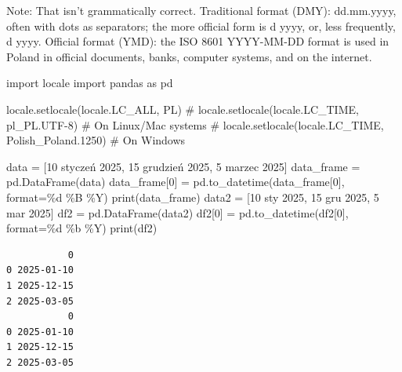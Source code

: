\documentclass[
  english,
  letterpaper,
  DIV=11,
  numbers=noendperiod]{scrreprt}
\newenvironment{Shaded}{\begin{snugshade}}{\end{snugshade}}
\newcommand{\BuiltInTok}[1]{\textcolor[rgb]{0.00,0.23,0.31}{#1}}
\newcommand{\CommentTok}[1]{\textcolor[rgb]{0.37,0.37,0.37}{#1}}
\newcommand{\DecValTok}[1]{\textcolor[rgb]{0.68,0.00,0.00}{#1}}
\newcommand{\ImportTok}[1]{\textcolor[rgb]{0.00,0.46,0.62}{#1}}
\newcommand{\NormalTok}[1]{\textcolor[rgb]{0.00,0.23,0.31}{#1}}
\newcommand{\OperatorTok}[1]{\textcolor[rgb]{0.37,0.37,0.37}{#1}}
\newcommand{\SpecialCharTok}[1]{\textcolor[rgb]{0.37,0.37,0.37}{#1}}
\newcommand{\StringTok}[1]{\textcolor[rgb]{0.13,0.47,0.30}{#1}}
\begin{document}
Note: That isn't grammatically correct. Traditional format (DMY):
dd.mm.yyyy, often with dots as separators; the more official form is d
yyyy, or, less frequently, d yyyy. Official format (YMD): the ISO 8601
YYYY-MM-DD format is used in Poland in official documents, banks,
computer systems, and on the internet.

\begin{Shaded}
\begin{Highlighting}[]
\ImportTok{import}\NormalTok{ locale}
\ImportTok{import}\NormalTok{ pandas }\ImportTok{as}\NormalTok{ pd}

\NormalTok{locale.setlocale(locale.LC\_ALL, }\StringTok{\textquotesingle{}PL\textquotesingle{}}\NormalTok{)}
\CommentTok{\# locale.setlocale(locale.LC\_TIME, \textquotesingle{}pl\_PL.UTF{-}8\textquotesingle{})  \# On Linux/Mac systems}
\CommentTok{\# locale.setlocale(locale.LC\_TIME, \textquotesingle{}Polish\_Poland.1250\textquotesingle{})  \# On Windows}

\NormalTok{data }\OperatorTok{=}\NormalTok{ [}\StringTok{\textquotesingle{}10 styczeń 2025\textquotesingle{}}\NormalTok{, }\StringTok{\textquotesingle{}15 grudzień 2025\textquotesingle{}}\NormalTok{, }\StringTok{\textquotesingle{}5 marzec 2025\textquotesingle{}}\NormalTok{]}
\NormalTok{data\_frame }\OperatorTok{=}\NormalTok{ pd.DataFrame(data)}
\NormalTok{data\_frame[}\DecValTok{0}\NormalTok{] }\OperatorTok{=}\NormalTok{ pd.to\_datetime(data\_frame[}\DecValTok{0}\NormalTok{], }\BuiltInTok{format}\OperatorTok{=}\StringTok{\textquotesingle{}}\SpecialCharTok{\%d}\StringTok{ \%B \%Y\textquotesingle{}}\NormalTok{)}
\BuiltInTok{print}\NormalTok{(data\_frame)}
\NormalTok{data2 }\OperatorTok{=}\NormalTok{ [}\StringTok{\textquotesingle{}10 sty 2025\textquotesingle{}}\NormalTok{, }\StringTok{\textquotesingle{}15 gru 2025\textquotesingle{}}\NormalTok{, }\StringTok{\textquotesingle{}5 mar 2025\textquotesingle{}}\NormalTok{]}
\NormalTok{df2 }\OperatorTok{=}\NormalTok{ pd.DataFrame(data2)}
\NormalTok{df2[}\DecValTok{0}\NormalTok{] }\OperatorTok{=}\NormalTok{ pd.to\_datetime(df2[}\DecValTok{0}\NormalTok{], }\BuiltInTok{format}\OperatorTok{=}\StringTok{\textquotesingle{}}\SpecialCharTok{\%d}\StringTok{ \%b \%Y\textquotesingle{}}\NormalTok{)}
\BuiltInTok{print}\NormalTok{(df2)}
\end{Highlighting}
\end{Shaded}

\begin{verbatim}
           0
0 2025-01-10
1 2025-12-15
2 2025-03-05
           0
0 2025-01-10
1 2025-12-15
2 2025-03-05
\end{verbatim}
\end{document}

